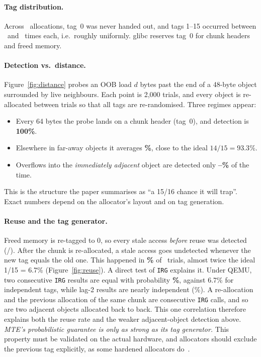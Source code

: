 \documentclass[11pt,a4paper]{article}
\begin{document}
\paragraph{Tag distribution.}
Across \HistN\ allocations, tag~0 was never handed out, and tags 1--15 occurred between \HistMin\ and \HistMax\ times each, i.e.\ roughly uniformly.
glibc reserves tag~0 for chunk headers and freed memory.

\paragraph{Detection vs.\ distance.}
Figure~\ref{fig:distance} probes an OOB load $d$ bytes past the end of a 48-byte object surrounded by live neighbours.
Each point is 2{,}000 trials, and every object is re-allocated between trials so that all tags are re-randomised.
Three regimes appear:
\begin{itemize}[itemsep=1pt]
\item Every 64 bytes the probe lands on a chunk header (tag~0), and detection is \textbf{100\%}.
\item Elsewhere in far-away objects it averages \textbf{\FarMean\%}, close to the ideal $14/15=93.3\%$.
\item Overflows into the \emph{immediately adjacent} object are detected only \textbf{\AdjMin--\AdjMax\%} of the time.
\end{itemize}
This is the structure the paper summarises as ``a 15/16 chance it will trap''.
Exact numbers depend on the allocator's layout and on tag generation.

\paragraph{Reuse and the tag generator.}
Freed memory is re-tagged to 0, so every stale access \emph{before} reuse was detected (\ReuseTrials/\ReuseTrials).
After the chunk is re-allocated, a stale access goes undetected whenever the new tag equals the old one.
This happened in \textbf{\ReuseUndet\%} of \ReuseTrials\ trials, almost twice the ideal 1/15 = 6.7\% (Figure~\ref{fig:reuse}).
A direct test of \texttt{IRG} explains it.
Under QEMU, two consecutive \texttt{IRG} results are equal with probability \textbf{\IrgLagOne\%}, against 6.7\% for independent tags, while lag-2 results are nearly independent (\IrgLagTwo\%).
A re-allocation and the previous allocation of the same chunk are consecutive \texttt{IRG} calls, and so are two adjacent objects allocated back to back.
This one correlation therefore explains both the reuse rate and the weaker adjacent-object detection above.
\emph{MTE's probabilistic guarantee is only as strong as its tag generator.}
This property must be validated on the actual hardware, and allocators should exclude the previous tag explicitly, as some hardened allocators do~\cite{scudo}.
\end{document}

